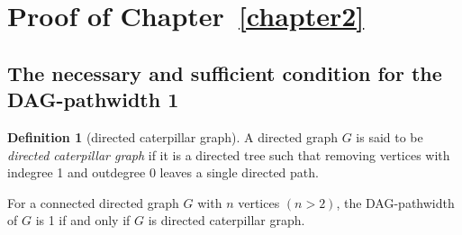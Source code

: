 \documentclass[runningheads]{llncs}
\theoremstyle{plain}
\theoremstyle{definition}
\newtheorem{definition}{Definition}
\begin{document}
\appendix
\section{Proof of Chapter~\ref{chapter2}}

\subsection{The necessary and sufficient condition for the DAG-pathwidth 1}\label{appendix_A1}

\begin{definition}[directed caterpillar graph]
    A directed graph $G$ is said to be \textit{directed caterpillar graph} if it is a directed tree such that removing vertices with indegree 1 and outdegree 0 leaves a single directed path.
\end{definition}

\begin{lemma} \label{caterpillar}
    For a connected directed graph $G$ with $n$ vertices $(n > 2)$, the DAG-pathwidth of $G$ is 1 if and only if $G$ is directed caterpillar graph.
\end{lemma}
\end{document}
